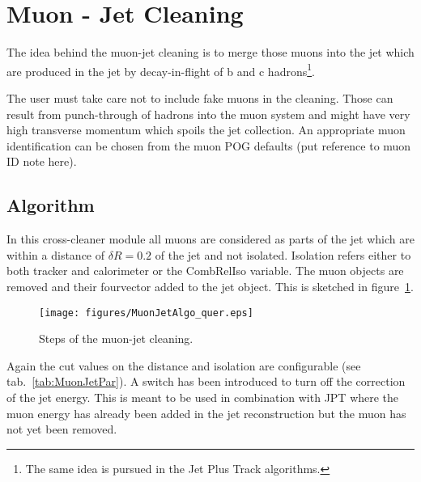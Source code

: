 \documentclass{cmspaper}
\begin{document}

\newpage
\section{Muon - Jet Cleaning}
The idea behind the muon-jet cleaning is to merge those muons into the jet which
are produced in the jet by decay-in-flight of b and c hadrons\footnote{The same
idea is pursued in the Jet Plus Track algorithms.}.

The user must take care not to include fake muons in the cleaning. Those can
result from punch-through of hadrons into the muon system and might have very
high transverse momentum which spoils the jet collection. An appropriate muon
identification can be chosen from the muon POG defaults (put reference to muon
ID note here).

\subsection{Algorithm}
In this cross-cleaner module all muons  are considered as parts of the jet which
are within a distance of $\delta R=0.2$ of the jet and not isolated. Isolation
refers either to both tracker and calorimeter or the CombRelIso variable. The
muon objects are removed and their fourvector added to the jet object. 
This is sketched in figure~\ref{fig:MJCleaning}.

\begin{figure}[hbt]
\begin{center}
\texttt{[image: figures/MuonJetAlgo\_quer.eps]}
\caption{Steps of the muon-jet cleaning.}
\label{fig:MJCleaning}
\end{center}
\end{figure}

Again the cut values on the distance and isolation are configurable (see
tab.~\ref{tab:MuonJetPar}). A switch has been introduced to turn off
the correction of the jet energy. This is meant to be used in combination with
JPT where the muon energy has already been added in the jet reconstruction but
the muon has not yet been removed.
\end{document}
